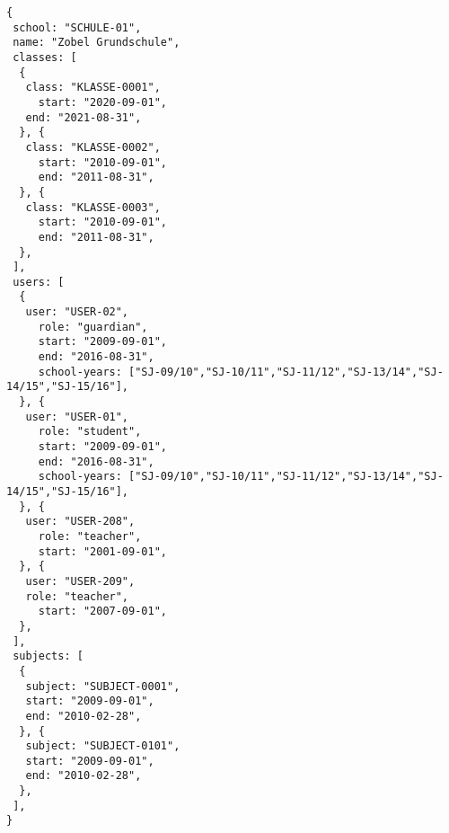 
\begin{lstlisting}[caption={Schulen-Datenmodell Beispiel 1},frame=tlrb]
{
 school: "SCHULE-01",
 name: "Zobel Grundschule",
 classes: [ 
  {
   class: "KLASSE-0001",
	 start: "2020-09-01",
   end: "2021-08-31",
  }, {
   class: "KLASSE-0002",
	 start: "2010-09-01",
	 end: "2011-08-31",
  }, {
   class: "KLASSE-0003", 
	 start: "2010-09-01",
	 end: "2011-08-31",
  },
 ],
 users: [
  {
   user: "USER-02",
 	 role: "guardian",
	 start: "2009-09-01",
	 end: "2016-08-31",
	 school-years: ["SJ-09/10","SJ-10/11","SJ-11/12","SJ-13/14","SJ-14/15","SJ-15/16"],
  }, {
   user: "USER-01",
	 role: "student",
	 start: "2009-09-01",
	 end: "2016-08-31",
	 school-years: ["SJ-09/10","SJ-10/11","SJ-11/12","SJ-13/14","SJ-14/15","SJ-15/16"],
  }, {
   user: "USER-208",
	 role: "teacher",
	 start: "2001-09-01",
  }, {
   user: "USER-209",
   role: "teacher",
 	 start: "2007-09-01",
  },
 ],
 subjects: [
  {
   subject: "SUBJECT-0001",
   start: "2009-09-01",
   end: "2010-02-28",
  }, {
   subject: "SUBJECT-0101",
   start: "2009-09-01",
   end: "2010-02-28",
  }, 
 ],
}
\end{lstlisting}
